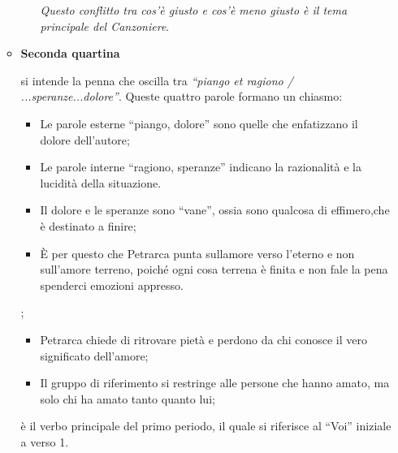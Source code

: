 \documentclass{article}
\begin{document}
\begin{enumerate}
\begin{itemize}[label=]
\begin{enumerate}[label=]
            \emph{Questo conflitto tra cos'è giusto e cos'è meno giusto è il tema principale
            del Canzoniere}.\\
            \phantom{}
        \end{enumerate}

        \newpage
        \item \textbf{Seconda quartina}
            \begin{enumerate}[label=]
                 si intende la penna che oscilla tra
                    \textit{``piango et ragiono / ...speranze...dolore''}. Queste quattro
                    parole formano un chiasmo:
                        \begin{itemize}
                            \item Le parole esterne ``piango, dolore'' sono quelle che
                                enfatizzano il dolore dell'autore;
                            \item Le parole interne ``ragiono, speranze'' indicano la
                                razionalità e la lucidità della situazione.
                        \end{itemize}
                    \begin{itemize}
                        \item Il dolore e le speranze sono ``vane'', ossia sono qualcosa
                            di effimero,che è destinato a finire;
                        \item È per questo che Petrarca punta sullamore verso l'eterno e non
                            sull'amore terreno, poiché ogni cosa terrena è finita e non fale la
                            pena spenderci emozioni appresso.
                    \end{itemize}

                ;
                    \begin{itemize}
                        \item Petrarca chiede di ritrovare pietà e perdono da chi conosce il
                            vero significato dell'amore;
                        \item Il gruppo di riferimento si restringe alle persone che hanno
                            amato, ma solo chi ha amato tanto quanto lui;
                    \end{itemize}
                 è il verbo principale del primo periodo, il quale si
                    riferisce al ``Voi'' iniziale a verso 1.
            \end{enumerate}


\end{itemize}
\end{enumerate}
\end{document}
